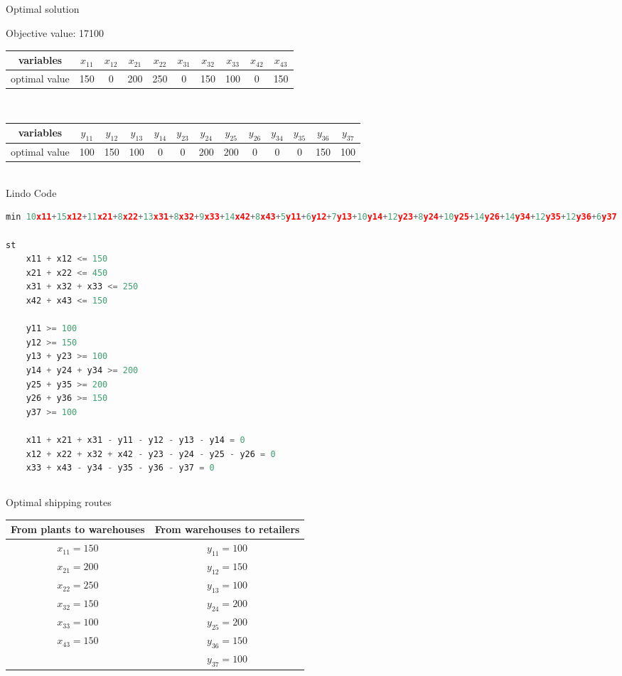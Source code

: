 \documentclass[11pt]{scrreprt}
\begin{document}
\subsection{}
Optimal solution

Objective value: 17100  \\

\begin{tabular}{|c|c|c|c|c|c|c|c|c|c|}
	\hline variables & $x_{11}$   &  $x_{12}$ & $x_{21}$ & $x_{22}$ & $x_{31}$ & $x_{32}$ & $x_{33}$ & $x_{42}$ & $x_{43}$      \\
	\hline optimal value & 150  &  0 & 200 & 250 & 0 & 150 & 100 & 0 & 150            \\
	\hline
\end{tabular} \\

\begin{tabular}{|c|c|c|c|c|c|c|c|c|c|c|c|c|}
	\hline variables & $y_{11}$ & $y_{12}$ & $y_{13}$ & $y_{14}$ & $y_{23}$ & $y_{24}$ & $y_{25}$ & $y_{26}$ & $y_{34}$ & $y_{35}$ & $y_{36}$ & $y_{37}$  \\
	\hline optimal value & 	100 & 150 & 100 & 0 & 0 & 200 & 200 & 0 & 0 & 0 & 150 & 100 \\
	 \hline
\end{tabular} \\

Lindo Code

\begin{lstlisting}[language=c]
min 10x11+15x12+11x21+8x22+13x31+8x32+9x33+14x42+8x43+5y11+6y12+7y13+10y14+12y23+8y24+10y25+14y26+14y34+12y35+12y36+6y37

st
	x11 + x12 <= 150
	x21 + x22 <= 450
	x31 + x32 + x33 <= 250
	x42 + x43 <= 150

	y11 >= 100
	y12 >= 150
	y13 + y23 >= 100
	y14 + y24 + y34 >= 200
	y25 + y35 >= 200
	y26 + y36 >= 150
	y37 >= 100

	x11 + x21 + x31 - y11 - y12 - y13 - y14 = 0
	x12 + x22 + x32 + x42 - y23 - y24 - y25 - y26 = 0
	x33 + x43 - y34 - y35 - y36 - y37 = 0
\end{lstlisting}

\subsection{}
Optimal shipping routes \\

\begin{tabular}{|c|c|}
	\hline From plants to warehouses & From warehouses to retailers \\
	\hline $x_{11} = 150$ & $y_{11} = 100$ \\
	\hline $x_{21} = 200$ &$y_{12} = 150$ \\
	\hline $x_{22} = 250$ &$y_{13} = 100$ \\
	\hline $x_{32} = 150$ &$y_{24} = 200$ \\
	\hline $x_{33} = 100$ & $y_{25} = 200$  \\
	\hline $x_{43} = 150$ & $y_{36} = 150$  \\
	\hline & $y_{37} = 100$ \\
	\hline
\end{tabular} \\
\end{document}
